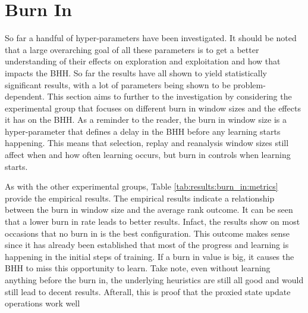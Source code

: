 \section{Burn In}
\label{sec:results:burn_in}

So far a handful of hyper-parameters have been investigated. It should be noted that a large overarching goal of all these parameters is to get a better understanding of their effects on exploration and exploitation and how that impacts the \Ac{BHH}. So far the results have all shown to yield statistically significant results, with a lot of parameters being shown to be problem-dependent. This section aims to further to the investigation by considering the experimental group that focuses on different burn in window sizes and the effects it has on the \Ac{BHH}. As a reminder to the reader, the burn in window size is a hyper-parameter that defines a delay in the \Ac{BHH} before any learning starts happening. This means that selection, replay and reanalysis window sizes still affect when and how often learning occurs, but burn in controls when learning starts.

As with the other experimental groups, Table \ref{tab:results:burn_in:metrics} provide the empirical results. The empirical results indicate a relationship between the burn in window size and the average rank outcome. It can be seen that a lower burn in rate leads to better results. Infact, the results show on most occasions that no burn in is the best configuration. This outcome makes sense since it has already been established that most of the progress and learning is happening in the initial steps of training. If a burn in value is big, it causes the \Ac{BHH} to miss this opportunity to learn. Take note, even without learning anything before the burn in, the underlying heuristics are still all good and would still lead to decent results. Afterall, this is proof that the proxied state update operations work well


